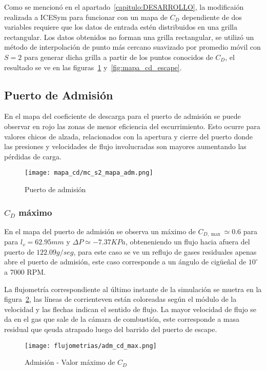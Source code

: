 Como se mencionó en el apartado~\ref{capitulo:DESARROLLO}, la modificaión
realizada a ICESym para funcionar con un mapa de $C_{D}$ dependiente de dos
variables requiere que los datos de entrada estén distribuidos en una grilla
rectangular.
%
Los datos obtenidos no forman una grilla rectangular, se utilizó un método de
interpolación de punto más cercano suavizado por promedio móvil con $S=2$ para
generar dicha grilla a partir de los puntos conocidos de $C_{D}$, el resultado
se ve en las figuras~\ref{fig:mapa_cd_admision} y~\ref{fig:mapa_cd_escape}.


\subsection{Puerto de Admisión}
%
En el mapa del coeficiente de descarga para el puerto de admisión se puede
observar en rojo las zonas de menor eficiencia del escurrimiento. Esto ocurre
para valores chicos de alzada, relacionados con la apertura y cierre del puerto
donde las presiones y velocidades de flujo involucradas son mayores aumentando
las pérdidas de carga.

\begin{figure}[ht!]
    \centering
    \texttt{[image: mapa\_cd/mc\_s2\_mapa\_adm.png]}
    \caption{Puerto de admisión}\label{fig:mapa_cd_admision}
\end{figure}

\subsubsection{$C_{D}$ máximo}
%
En el mapa del puerto de admisión se observa un máximo de $C_{D,\max}\simeq 0.6$
para para $l_{v}=62.95 mm$ y $\Delta P\simeq -7.37 KPa$, obteneniendo un flujo
hacia afuera del puerto de $122.09 g/seg$, para este caso se ve un reflujo de
gases residuales apenas abre el puerto de admisión, este caso corresponde a un
ángulo de cigüeñal de $10^{\circ}$ a 7000 RPM.

La flujometría correspondiente al último instante de la simulación se muetra en
la figura~\ref{fig:adm_cd_max}, las líneas de corrienteven  están coloreadas
según el módulo de la velocidad y las flechas indican el sentido de flujo.
%
La mayor velocidad de flujo se da en el gas que sale de la cámara de combustión,
este corresponde a masa residual que qeuda atrapado luego del barrido del puerto
de escape.

\begin{figure}[ht!]
    \centering
    \texttt{[image: flujometrias/adm\_cd\_max.png]}
    \caption{Admisión - Valor máximo de $C_{D}$}\label{fig:adm_cd_max}
\end{figure}

